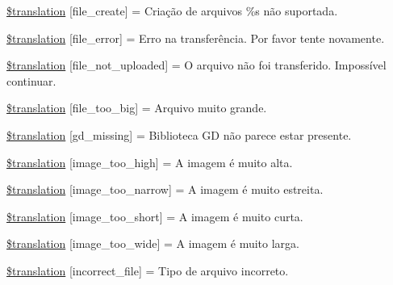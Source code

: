 \begin{DoxyCompactItemize}
\item 
\hyperlink{class_8upload_8pt___b_r_8php_a1ecb4673e4fb69e06b3f20b65cecf30a}{\$translation} \mbox{[}\textquotesingle{}file\+\_\+create\textquotesingle{}\mbox{]} = \textquotesingle{}Criação de arquivos \%s não suportada.\textquotesingle{}
\item 
\hyperlink{class_8upload_8pt___b_r_8php_ac7498e49b9771b04698029aa61c70821}{\$translation} \mbox{[}\textquotesingle{}file\+\_\+error\textquotesingle{}\mbox{]} = \textquotesingle{}Erro na transferência. Por favor tente novamente.\textquotesingle{}
\item 
\hyperlink{class_8upload_8pt___b_r_8php_a4ce76e7be0b3a03c2b47f6d70c21832e}{\$translation} \mbox{[}\textquotesingle{}file\+\_\+not\+\_\+uploaded\textquotesingle{}\mbox{]} = \textquotesingle{}O arquivo não foi transferido. Impossível continuar.\textquotesingle{}
\item 
\hyperlink{class_8upload_8pt___b_r_8php_a476278eb4a0c3df56af068e2d511a741}{\$translation} \mbox{[}\textquotesingle{}file\+\_\+too\+\_\+big\textquotesingle{}\mbox{]} = \textquotesingle{}Arquivo muito grande.\textquotesingle{}
\item 
\hyperlink{class_8upload_8pt___b_r_8php_a7f3dfcc0db4bbc0f2e7210c439798e56}{\$translation} \mbox{[}\textquotesingle{}gd\+\_\+missing\textquotesingle{}\mbox{]} = \textquotesingle{}Biblioteca G\+D não parece estar presente.\textquotesingle{}
\item 
\hyperlink{class_8upload_8pt___b_r_8php_aa27bde361343f3b63c7cd441860024f8}{\$translation} \mbox{[}\textquotesingle{}image\+\_\+too\+\_\+high\textquotesingle{}\mbox{]} = \textquotesingle{}A imagem é muito alta.\textquotesingle{}
\item 
\hyperlink{class_8upload_8pt___b_r_8php_a5c9a4cd67fd21c32e0a3b434591a6037}{\$translation} \mbox{[}\textquotesingle{}image\+\_\+too\+\_\+narrow\textquotesingle{}\mbox{]} = \textquotesingle{}A imagem é muito estreita.\textquotesingle{}
\item 
\hyperlink{class_8upload_8pt___b_r_8php_a86fcd4e1157b00032df451188d735527}{\$translation} \mbox{[}\textquotesingle{}image\+\_\+too\+\_\+short\textquotesingle{}\mbox{]} = \textquotesingle{}A imagem é muito curta.\textquotesingle{}
\item 
\hyperlink{class_8upload_8pt___b_r_8php_a0dd3e4930ca1f59ae280f4b1006525cd}{\$translation} \mbox{[}\textquotesingle{}image\+\_\+too\+\_\+wide\textquotesingle{}\mbox{]} = \textquotesingle{}A imagem é muito larga.\textquotesingle{}
\item 
\hyperlink{class_8upload_8pt___b_r_8php_a4d32343e2699edd6fd435f9c832cb9c7}{\$translation} \mbox{[}\textquotesingle{}incorrect\+\_\+file\textquotesingle{}\mbox{]} = \textquotesingle{}Tipo de arquivo incorreto.\textquotesingle{}

\end{DoxyCompactItemize}
